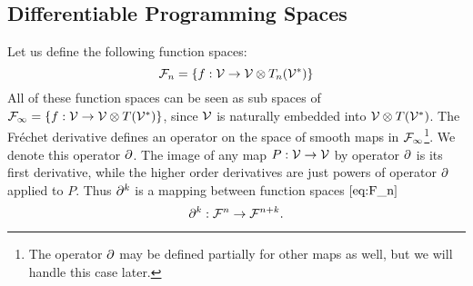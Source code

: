 \subsection{Differentiable Programming Spaces}

Let us define the following function spaces:
 \begin{equation}\label{eq:F_n}
  \mathcal{F}_n=\{f:\mathcal{V}\to \mathcal{V}\otimes T_n(\mathcal{V}^*)\}
 \end{equation}
All of these function spaces can be seen as sub spaces of $\mathcal{F}_\infty=\{f:\mathcal{V}\to \mathcal{V}\otimes
T(\mathcal{V}^*)\}$, since $\mathcal{V}$ is naturally embedded into $ \mathcal{V}\otimes T(\mathcal{V}^*)$. The
Fréchet derivative defines an operator on the space of smooth maps in $\mathcal{F}_\infty$\footnote{The operator $\partial$ may be defined partially for other maps as
   well, but we will handle this case later.}. We denote this operator $\partial$. The image of any map
 $P:\mathcal{V}\to \mathcal{V}$ by operator $\partial$ is its first derivative, while the higher order
 derivatives are just powers of operator $\partial$ applied to $P$.
 Thus $\partial^k$ is a mapping between function spaces $\eqref{eq:F_n}$
 \begin{equation}\label{eq:toFn+k}
 \partial^k:\mathcal{F}^n\to\mathcal{F}^{n+k}.
 \end{equation}
 
